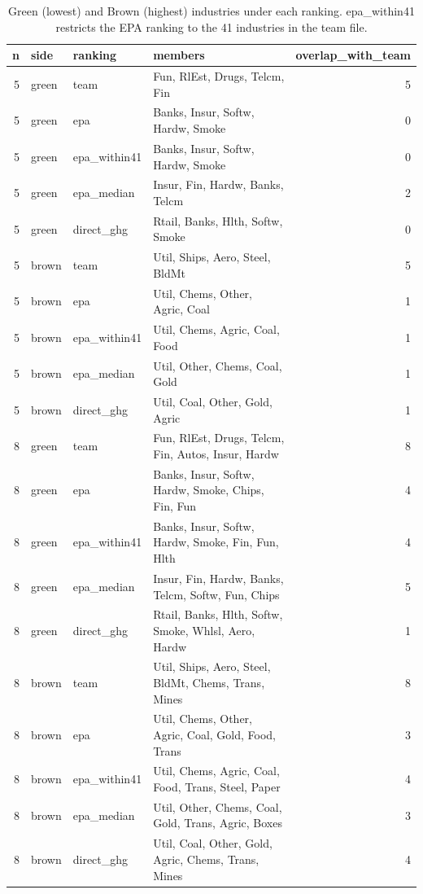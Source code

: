 \begin{table}
\caption{Green (lowest) and Brown (highest) industries under each ranking. epa\_within41 restricts the EPA ranking to the 41 industries in the team file.}
\label{tab:m4_membership}
\begin{tabular}{rlllr}
\toprule
n & side & ranking & members & overlap\_with\_team \\
\midrule
5 & green & team & Fun, RlEst, Drugs, Telcm, Fin & 5 \\
5 & green & epa & Banks, Insur, Softw, Hardw, Smoke & 0 \\
5 & green & epa\_within41 & Banks, Insur, Softw, Hardw, Smoke & 0 \\
5 & green & epa\_median & Insur, Fin, Hardw, Banks, Telcm & 2 \\
5 & green & direct\_ghg & Rtail, Banks, Hlth, Softw, Smoke & 0 \\
5 & brown & team & Util, Ships, Aero, Steel, BldMt & 5 \\
5 & brown & epa & Util, Chems, Other, Agric, Coal & 1 \\
5 & brown & epa\_within41 & Util, Chems, Agric, Coal, Food & 1 \\
5 & brown & epa\_median & Util, Other, Chems, Coal, Gold & 1 \\
5 & brown & direct\_ghg & Util, Coal, Other, Gold, Agric & 1 \\
8 & green & team & Fun, RlEst, Drugs, Telcm, Fin, Autos, Insur, Hardw & 8 \\
8 & green & epa & Banks, Insur, Softw, Hardw, Smoke, Chips, Fin, Fun & 4 \\
8 & green & epa\_within41 & Banks, Insur, Softw, Hardw, Smoke, Fin, Fun, Hlth & 4 \\
8 & green & epa\_median & Insur, Fin, Hardw, Banks, Telcm, Softw, Fun, Chips & 5 \\
8 & green & direct\_ghg & Rtail, Banks, Hlth, Softw, Smoke, Whlsl, Aero, Hardw & 1 \\
8 & brown & team & Util, Ships, Aero, Steel, BldMt, Chems, Trans, Mines & 8 \\
8 & brown & epa & Util, Chems, Other, Agric, Coal, Gold, Food, Trans & 3 \\
8 & brown & epa\_within41 & Util, Chems, Agric, Coal, Food, Trans, Steel, Paper & 4 \\
8 & brown & epa\_median & Util, Other, Chems, Coal, Gold, Trans, Agric, Boxes & 3 \\
8 & brown & direct\_ghg & Util, Coal, Other, Gold, Agric, Chems, Trans, Mines & 4 \\
\bottomrule
\end{tabular}
\end{table}
